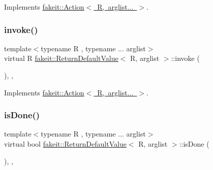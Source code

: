 Implements \mbox{\hyperlink{structfakeit_1_1Action_a85503300bf8134ce55761db5f643b00c}{fakeit\+::\+Action$<$ R, arglist... $>$}}.

\mbox{\label{structfakeit_1_1ReturnDefaultValue_a9b57c8c162e162b97415595f966e9c4a}} 
\subsubsection{\texorpdfstring{invoke()}{invoke()}\hspace{0.1cm}{\footnotesize\ttfamily [9/9]}}
{\footnotesize\ttfamily template$<$typename R , typename ... arglist$>$ \\
virtual R \mbox{\hyperlink{structfakeit_1_1ReturnDefaultValue}{fakeit\+::\+Return\+Default\+Value}}$<$ R, arglist $>$\+::invoke (\begin{DoxyParamCaption}\item[{const \mbox{\hyperlink{namespacefakeit_a476a37a598825e1b5dd67b3a176491a1}{Arguments\+Tuple}}$<$ arglist... $>$ \&}]{ }\end{DoxyParamCaption})\hspace{0.3cm}{\ttfamily [inline]}, {\ttfamily [override]}, {\ttfamily [virtual]}}



Implements \mbox{\hyperlink{structfakeit_1_1Action_a85503300bf8134ce55761db5f643b00c}{fakeit\+::\+Action$<$ R, arglist... $>$}}.

\mbox{\label{structfakeit_1_1ReturnDefaultValue_a7fbbfec578ab1944c73379d63185e06e}} 
\subsubsection{\texorpdfstring{isDone()}{isDone()}\hspace{0.1cm}{\footnotesize\ttfamily [1/9]}}
{\footnotesize\ttfamily template$<$typename R , typename ... arglist$>$ \\
virtual bool \mbox{\hyperlink{structfakeit_1_1ReturnDefaultValue}{fakeit\+::\+Return\+Default\+Value}}$<$ R, arglist $>$\+::is\+Done (\begin{DoxyParamCaption}{ }\end{DoxyParamCaption})\hspace{0.3cm}{\ttfamily [inline]}, {\ttfamily [override]}, {\ttfamily [virtual]}}



